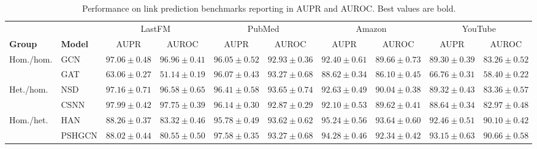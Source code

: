 \documentclass[sigconf,anonymous,review]{acmart}
\begin{document}
\begin{table}[t]
  \centering
  \caption{Performance on link prediction benchmarks reporting in AUPR and AUROC. Best values are bold.}
  \label{tab:link-pred}
  \scriptsize
  \setlength{\tabcolsep}{2.5pt}
  \resizebox{0.8\textwidth}{!}
  {%
  \begin{tabular}{llcccccccc}
    \toprule
    & & \multicolumn{2}{c}{LastFM} & \multicolumn{2}{c}{PubMed} & \multicolumn{2}{c}{Amazon} & \multicolumn{2}{c}{YouTube} \\
    \cmidrule(lr){3-4}\cmidrule(lr){5-6}\cmidrule(lr){7-8}\cmidrule(lr){9-10}
    \textbf{Group} & \textbf{Model} & AUPR & AUROC & AUPR & AUROC & AUPR & AUROC & AUPR & AUROC \\
    \midrule

    \multirow{2}{*}{Hom./hom.}
    & GCN
    & $97.06 \pm 0.48$ & $96.96 \pm 0.41$
    & $96.05 \pm 0.52$ & $92.93 \pm 0.36$
    & $92.40 \pm 0.61$ & $89.66 \pm 0.73$
    & $89.30 \pm 0.39$ & $83.26 \pm 0.52$ \\
    & GAT
    & $63.06 \pm 0.27$ & $51.14 \pm 0.19$
    & $96.07 \pm 0.43$ & $93.27 \pm 0.68$
    & $88.62 \pm 0.34$ & $86.10 \pm 0.45$
    & $66.76 \pm 0.31$ & $58.40 \pm 0.22$ \\
    \midrule

    \multirow{2}{*}{Het./hom.}
    & NSD
    & $97.16 \pm 0.71$ & $96.58 \pm 0.65$
    & $96.41 \pm 0.58$ & $93.65 \pm 0.74$
    & $92.63 \pm 0.49$ & $90.04 \pm 0.38$
    & $89.32 \pm 0.43$ & $83.36 \pm 0.57$ \\
    & CSNN
    & $97.99 \pm 0.42$ & $97.75 \pm 0.39$
    & $96.14 \pm 0.30$ & $92.87 \pm 0.29$
    & $92.10 \pm 0.53$ & $89.62 \pm 0.41$
    & $88.64 \pm 0.34$ & $82.97 \pm 0.48$ \\
    \midrule

    \multirow{2}{*}{Hom./het.}
    & HAN
    & $88.26 \pm 0.37$ & $83.32 \pm 0.46$
    & $95.78 \pm 0.49$ & $93.62 \pm 0.62$
    & $95.24 \pm 0.56$ & $93.64 \pm 0.60$
    & $92.46 \pm 0.51$ & $90.10 \pm 0.42$ \\
    & PSHGCN
    & $88.02 \pm 0.44$ & $80.55 \pm 0.50$
    & $97.58 \pm 0.35$ & $93.27 \pm 0.68$
    & $94.28 \pm 0.46$ & $92.34 \pm 0.42$
    & $93.15 \pm 0.63$ & $90.66 \pm 0.58$ \\
    \midrule


\end{tabular}}
\end{table}
\end{document}
